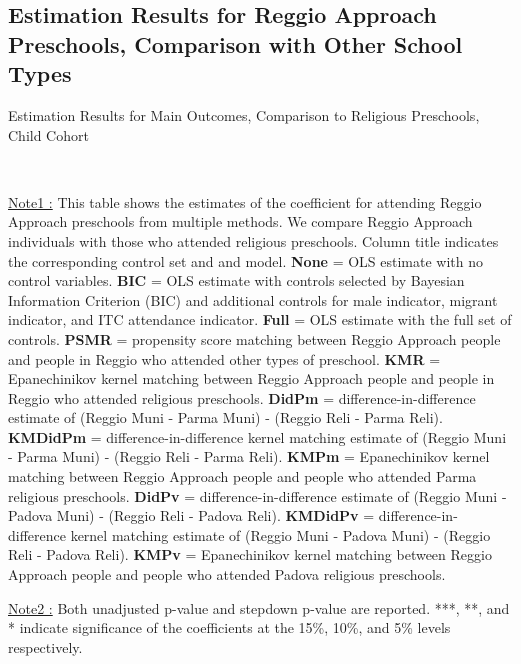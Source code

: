 \subsection{Estimation Results for Reggio Approach Preschools, Comparison with Other School Types} \label{app:comparison-reli-stat}

\begin{table}[H] \caption{Estimation Results for Main Outcomes, Comparison to Religious Preschools, Child Cohort} \label{ols-M-child-reg-reli}
\scalebox{0.59}{}
\vspace{1ex} \\
\footnotesize\raggedright{\underline{Note1 :} This table shows the estimates of the coefficient for attending Reggio Approach preschools from multiple methods. We compare Reggio Approach individuals with those who attended religious preschools. Column title indicates the corresponding control set and and model. \textbf{None} = OLS estimate with no control variables. \textbf{BIC} = OLS estimate with controls selected by Bayesian Information Criterion (BIC) and additional controls for male indicator, migrant indicator, and ITC attendance indicator. \textbf{Full} = OLS estimate with the full set of controls. \textbf{PSMR} =  propensity score matching between Reggio Approach people and people in Reggio who attended other types of preschool. \textbf{KMR} = Epanechinikov kernel matching between Reggio Approach people and people in Reggio who attended religious preschools. \textbf{DidPm} = difference-in-difference estimate of (Reggio Muni - Parma Muni) - (Reggio Reli - Parma Reli). \textbf{KMDidPm} = difference-in-difference kernel matching estimate of (Reggio Muni - Parma Muni) - (Reggio Reli - Parma Reli). \textbf{KMPm} = Epanechinikov kernel matching between Reggio Approach people and people who attended Parma religious preschools. \textbf{DidPv} = difference-in-difference estimate of (Reggio Muni - Padova Muni) - (Reggio Reli - Padova Reli). \textbf{KMDidPv} = difference-in-difference kernel matching estimate of (Reggio Muni - Padova Muni) - (Reggio Reli - Padova Reli).  \textbf{KMPv} = Epanechinikov kernel matching between Reggio Approach people and people who attended Padova religious preschools.}

\footnotesize\raggedright{\underline{Note2 :} Both unadjusted p-value and stepdown p-value are reported. ***, **, and * indicate significance of the coefficients at the 15\%, 10\%, and 5\% levels respectively.}

\end{table}


